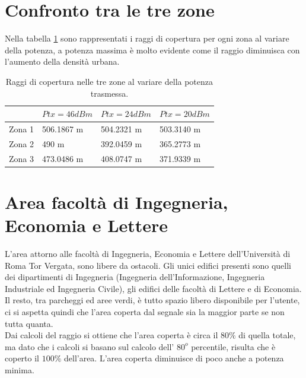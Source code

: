 \section*{Confronto tra le tre zone}
Nella tabella \ref{tab:confrontozone} sono rappresentati i raggi di copertura per ogni zona al variare della potenza, a potenza massima è
molto evidente come il raggio diminuisca con l'aumento della densità urbana.
 \begin{table}[h]\footnotesize
  \caption{Raggi di copertura nelle tre zone al variare della potenza trasmessa.}
  \label{tab:confrontozone}
  \begin{tabularx}{\textwidth}{lXXX}
    \toprule
      & $Ptx = 46dBm$ & $Ptx = 24dBm$ & $Ptx = 20dBm$ \\
    \midrule
      Zona 1 & 506.1867 m & 504.2321 m & 503.3140 m \\
      Zona 2 & 490 m & 392.0459 m & 365.2773 m \\
      Zona 3& 473.0486 m & 408.0747 m & 371.9339 m \\
    \bottomrule
    \end{tabularx}
  \end{table}

\newpage
\section{Area facoltà di Ingegneria, Economia e Lettere}
L'area attorno alle facoltà di Ingegneria, Economia e Lettere dell'Università di Roma Tor Vergata, sono libere da ostacoli.
Gli unici edifici presenti sono quelli dei dipartimenti di Ingegneria (Ingegneria dell'Informazione, Ingegneria Industriale ed Ingegneria
Civile), gli edifici delle facoltà di Lettere e di Economia. 
Il resto, tra parcheggi ed aree verdi, è tutto spazio libero disponibile per l'utente, ci si aspetta quindi che l'area coperta dal segnale
sia la maggior parte se non tutta quanta. \\
Dai calcoli del raggio si ottiene che l'area coperta è circa il $80\%$ di quella totale, ma dato che i calcoli si basano sul calcolo dell'
$80^o$ percentile, risulta che è coperto il $100\%$ dell'area. L'area coperta diminuisce di poco anche a potenza minima.

